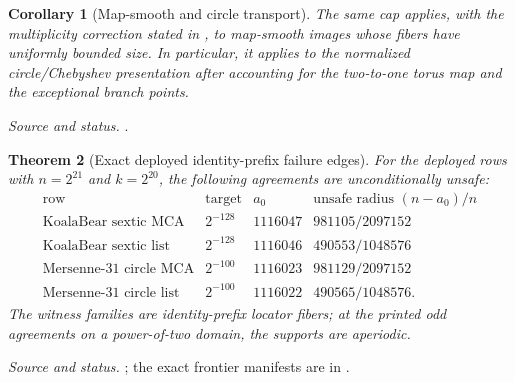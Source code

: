 \documentclass[11pt,a4paper]{amsart}
\numberwithin{equation}{section}
\newtheorem{theorem}{Theorem}[section]
\newtheorem{corollary}[theorem]{Corollary}
\theoremstyle{remark}
\newcommand{\source}[1]{\par\smallskip\noindent\textit{Source and status.} #1\par}
\begin{document}
\begin{corollary}[Map-smooth and circle transport]\label{cor:transport}
The same cap applies, with the multiplicity correction stated in \cite{ChoCap26}, to map-smooth images whose fibers have uniformly bounded size.  In particular, it applies to the normalized circle/Chebyshev presentation after accounting for the two-to-one torus map and the exceptional branch points.
\end{corollary}
\source{\cite[Map-smooth and circle cap theorems]{ChoCap26}.}

\begin{theorem}[Exact deployed identity-prefix failure edges]\label{thm:deployed-unsafe}
For the deployed rows with $n=2^{21}$ and $k=2^{20}$, the following agreements are unconditionally unsafe:
\[
\begin{array}{c|c|c|c}
\text{row}&\text{target}&a_0&\text{unsafe radius }(n-a_0)/n\\ \hline
\text{KoalaBear sextic MCA}&2^{-128}&1116047&981105/2097152\\
\text{KoalaBear sextic list}&2^{-128}&1116046&490553/1048576\\
\text{Mersenne-31 circle MCA}&2^{-100}&1116023&981129/2097152\\
\text{Mersenne-31 circle list}&2^{-100}&1116022&490565/1048576.
\end{array}
\]
The witness families are identity-prefix locator fibers; at the printed odd agreements on a power-of-two domain, the supports are aperiodic.
\end{theorem}
\source{\cite[Corrected deployed identity-prefix floors]{ChoCap26}; the exact frontier manifests are in \cite{FrontierRows26}.}
\end{document}
